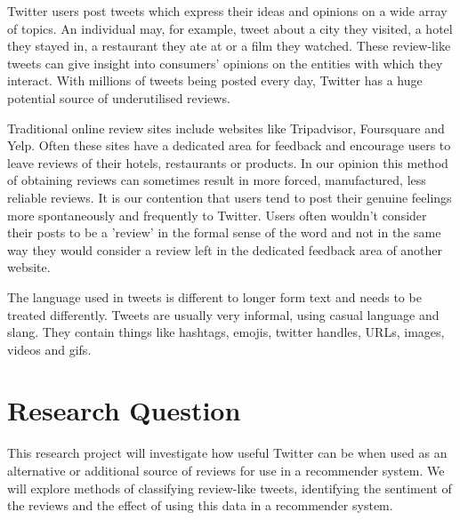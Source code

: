 Twitter users post tweets which express their ideas and opinions on a wide array of topics. An individual may, for example, tweet about a city they visited, a hotel they stayed in, a restaurant they ate at or a film they watched. These review-like tweets can give insight into consumers' opinions on the entities with which they interact. With millions of tweets being posted every day, Twitter has a huge potential source of underutilised reviews.

Traditional online review sites include websites like Tripadvisor, Foursquare and Yelp. Often these sites have a dedicated area for feedback and encourage users to leave reviews of their hotels, restaurants or products. In our opinion this method of obtaining reviews can sometimes result in more forced, manufactured, less reliable reviews. It is our contention that users tend to post their genuine feelings more spontaneously and frequently to Twitter. Users often wouldn't consider their posts to be a 'review' in the formal sense of the word and not in the same way they would consider a review left in the dedicated feedback area of another website.


The language used in tweets is different to longer form text and needs to be treated differently. Tweets are usually very informal, using casual language and slang. They contain things like hashtags, emojis, twitter handles, URLs, images, videos and gifs.

\section{Research Question}
This research project will investigate how useful Twitter can be when used as an alternative or additional source of reviews for use in a recommender system. We will explore methods of classifying review-like tweets, identifying the sentiment of the reviews and the effect of using this data in a recommender system.

